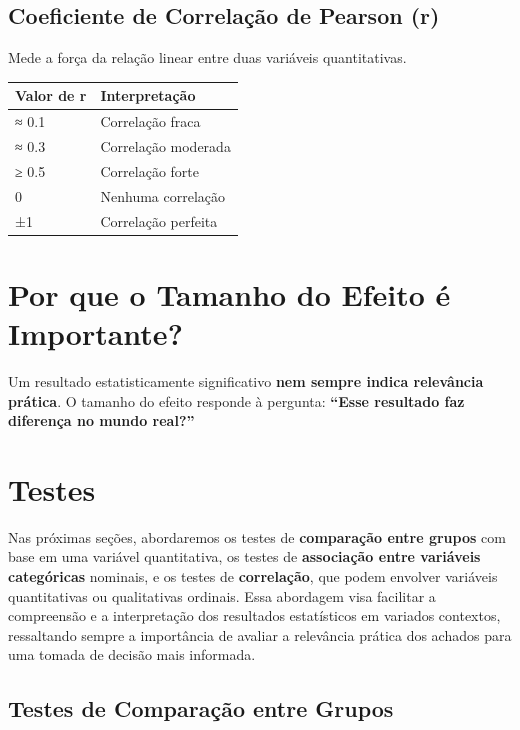 \documentclass[
]{book}
\begin{document}
\subsection{Coeficiente de Correlação de Pearson (r)}\label{coeficiente-de-correlauxe7uxe3o-de-pearson-r}

Mede a força da relação linear entre duas variáveis quantitativas.

\begin{longtable}[]{@{}ll@{}}
\toprule\noalign{}
Valor de r & Interpretação \\
\midrule\noalign{}
\endhead
\bottomrule\noalign{}
\endlastfoot
≈ 0.1 & Correlação fraca \\
≈ 0.3 & Correlação moderada \\
≥ 0.5 & Correlação forte \\
0 & Nenhuma correlação \\
±1 & Correlação perfeita \\
\end{longtable}

\section{Por que o Tamanho do Efeito é Importante?}\label{por-que-o-tamanho-do-efeito-uxe9-importante}

Um resultado estatisticamente significativo \textbf{nem sempre indica relevância prática}. O tamanho do efeito responde à pergunta: \textbf{``Esse resultado faz diferença no mundo real?''}

\section{Testes}\label{testes}

Nas próximas seções, abordaremos os testes de \textbf{comparação entre grupos} com base em uma variável quantitativa, os testes de \textbf{associação entre variáveis categóricas} nominais, e os testes de \textbf{correlação}, que podem envolver variáveis quantitativas ou qualitativas ordinais. Essa abordagem visa facilitar a compreensão e a interpretação dos resultados estatísticos em variados contextos, ressaltando sempre a importância de avaliar a relevância prática dos achados para uma tomada de decisão mais informada.

\subsection{Testes de Comparação entre Grupos}\label{testes-de-comparauxe7uxe3o-entre-grupos}
\end{document}
